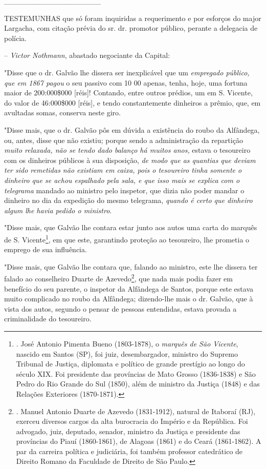 \_\_\_\_\_\_\_\_\_\_\_\_\_\_\_\_\_\_

TESTEMUNHAS que só foram inquiridas a requerimento e por esforços do
major Largacha, com citação prévia do sr. dr. promotor público, perante
a delegacia de polícia.

-- \emph{Victor Nothmann}, abastado negociante da Capital:

"Disse que o dr. Galvão lhe dissera ser inexplicável que um
\emph{empregado público, que em 1867 pagou} o seu passivo com 10 00
apenas, tenha, hoje, uma fortuna maior de 200:000\$000 {[}réis{]}!
Contando, entre outros prédios, um em S. Vicente, do valor de
46:000\$000 {[}réis{]}, e tendo constantemente dinheiros a prêmio, que,
em avultadas somas, conserva neste giro.

"Disse mais, que o dr. Galvão pôs em dúvida a existência do roubo da
Alfândega, ou, antes, disse que não existiu; porque sendo a
administração da repartição \emph{muito relaxada, não se tendo dado
balanço há muitos anos,} estava o tesoureiro com os dinheiros públicos à
sua disposição, \emph{de modo que as quantias que deviam ter sido
remetidas não existiam em caixa, pois o tesoureiro tinha somente o
dinheiro que se achou espalhado pela sala, e que isso mais se explica
com o telegrama} mandado ao ministro pelo inspetor, que dizia não poder
mandar o dinheiro no dia da expedição do mesmo telegrama, \emph{quando é
certo que dinheiro algum lhe havia pedido o ministro}.

"Disse mais, que Galvão lhe contara estar junto aos autos uma carta do
marquês de S. Vicente\footnote{. José Antonio Pimenta Bueno (1803-1878),
  o \emph{marquês de São Vicente}, nascido em Santos (SP), foi juiz,
  desembargador, ministro do Supremo Tribunal de Justiça, diplomata e
  político de grande prestígio ao longo do século XIX. Foi presidente
  das províncias de Mato Grosso (1836-1838) e São Pedro do Rio Grande do
  Sul (1850), além de ministro da Justiça (1848) e das Relações
  Exteriores (1870-1871).}, em que este, garantindo proteção ao
tesoureiro, lhe prometia o emprego de sua influência.

"Disse mais, que Galvão lhe contara que, falando ao ministro, este lhe
dissera ter falado ao conselheiro Duarte de Azevedo\footnote{. Manuel
  Antonio Duarte de Azevedo (1831-1912), natural de Itaboraí (RJ),
  exerceu diversos cargos da alta burocracia do Império e da República.
  Foi advogado, juiz, deputado, senador, ministro da Justiça e
  presidente das províncias do Piauí (1860-1861), de Alagoas (1861) e do
  Ceará (1861-1862). A par da carreira política e judiciária, foi também
  professor catedrático de Direito Romano da Faculdade de Direito de São
  Paulo.}, que nada mais podia fazer em benefício do seu parente, o
inspetor da Alfândega de Santos, porque este estava muito complicado no
roubo da Alfândega; dizendo-lhe mais o dr. Galvão, que à vista dos
autos, segundo o pensar de pessoas entendidas, estava provada a
criminalidade do tesoureiro.

